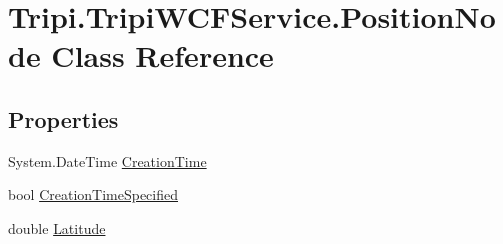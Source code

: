 \hypertarget{class_tripi_1_1_tripi_w_c_f_service_1_1_position_node}{
\section{Tripi.TripiWCFService.PositionNode Class Reference}
\label{class_tripi_1_1_tripi_w_c_f_service_1_1_position_node}
}


 
\subsection*{Properties}
\begin{DoxyCompactItemize}
\item 
\hypertarget{class_tripi_1_1_tripi_w_c_f_service_1_1_position_node_acddd1a828dc00e60768c8d20b43ad2cf}{
System.DateTime \hyperlink{class_tripi_1_1_tripi_w_c_f_service_1_1_position_node_acddd1a828dc00e60768c8d20b43ad2cf}{CreationTime}}
\label{class_tripi_1_1_tripi_w_c_f_service_1_1_position_node_acddd1a828dc00e60768c8d20b43ad2cf}

\begin{DoxyCompactList}\small\item\em \item\end{DoxyCompactList}\item 
\hypertarget{class_tripi_1_1_tripi_w_c_f_service_1_1_position_node_a900e6a245671b82fbac54506456d4386}{
bool \hyperlink{class_tripi_1_1_tripi_w_c_f_service_1_1_position_node_a900e6a245671b82fbac54506456d4386}{CreationTimeSpecified}}
\label{class_tripi_1_1_tripi_w_c_f_service_1_1_position_node_a900e6a245671b82fbac54506456d4386}

\begin{DoxyCompactList}\small\item\em \item\end{DoxyCompactList}\item 
\hypertarget{class_tripi_1_1_tripi_w_c_f_service_1_1_position_node_a7d352a95a6829f8b71c2408d811244c1}{
double \hyperlink{class_tripi_1_1_tripi_w_c_f_service_1_1_position_node_a7d352a95a6829f8b71c2408d811244c1}{Latitude}}
\label{class_tripi_1_1_tripi_w_c_f_service_1_1_position_node_a7d352a95a6829f8b71c2408d811244c1}


\end{DoxyCompactItemize}
